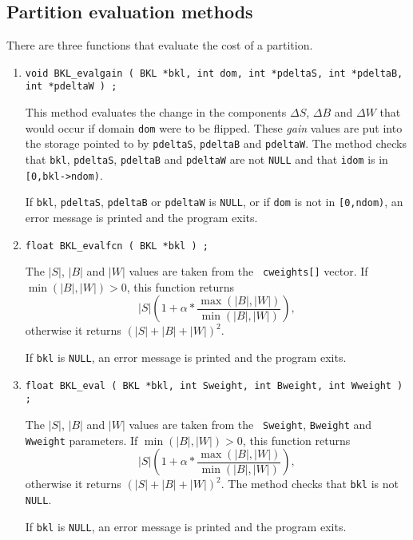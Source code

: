 \subsection{Partition evaluation methods}
\label{subsection:BKL:proto:evaluation}
\par
There are three functions that evaluate the cost of a partition.
\par
\begin{enumerate}
\item
\begin{verbatim}
void BKL_evalgain ( BKL *bkl, int dom, int *pdeltaS, int *pdeltaB, int *pdeltaW ) ;
\end{verbatim}
This method evaluates the change in the components
$\Delta S$, $\Delta B$ and $\Delta W$
that would occur if domain {\tt dom} were to be flipped.
These {\it gain} values are put into the storage pointed to by
{\tt pdeltaS}, {\tt pdeltaB} and {\tt pdeltaW}.
The method checks that {\tt bkl}, {\tt pdeltaS}, {\tt pdeltaB} 
and {\tt pdeltaW} are not {\tt NULL}
and that {\tt idom} is in {\tt [0,bkl->ndom)}.
\par {}
If {\tt bkl}, {\tt pdeltaS}, {\tt pdeltaB} or {\tt pdeltaW}
is {\tt NULL},
or if {\tt dom} is not in {\tt [0,ndom)},
an error message is printed and the program exits.
\item
\begin{verbatim}
float BKL_evalfcn ( BKL *bkl ) ;
\end{verbatim}
The $|S|$, $|B|$ and $|W|$ values are taken from the {\tt
cweights[]} vector.
If $\min(|B|,|W|) > 0$, this function returns
$$
|S|\left(1 + \alpha * \frac{\max(|B|,|W|)}{\min(|B|,|W|)} \right),
$$
otherwise it returns $(|S| + |B| + |W|)^2$.
\par {}
If {\tt bkl} is {\tt NULL},
an error message is printed and the program exits.
\item
\begin{verbatim}
float BKL_eval ( BKL *bkl, int Sweight, int Bweight, int Wweight ) ;
\end{verbatim}
The $|S|$, $|B|$ and $|W|$ values are taken from the {\tt
Sweight}, {\tt Bweight} and {\tt Wweight} parameters.
If $\min(|B|,|W|) > 0$, this function returns
$$
|S|\left(1 + \alpha * \frac{\max(|B|,|W|)}{\min(|B|,|W|)} \right),
$$
otherwise it returns $(|S| + |B| + |W|)^2$.
The method checks that {\tt bkl} is not {\tt NULL}.
\par {}
If {\tt bkl} is {\tt NULL},
an error message is printed and the program exits.
\end{enumerate}
\par
